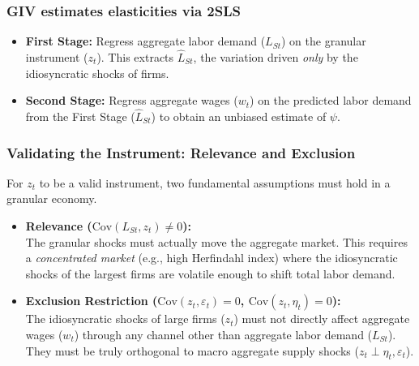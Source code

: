 \documentclass[aspectratio=169,11pt]{beamer}
\begin{document}
\begin{frame}
    \frametitle{GIV estimates elasticities via 2SLS}
    \begin{itemize}
        \item \large{\textbf{First Stage:} Regress aggregate labor demand ($L_{St}$) on the granular instrument ($z_t$). This extracts $\widehat{L}_{St}$, the variation driven \emph{only} by the idiosyncratic shocks of firms.}
              \vspace{0.5cm}
        \item \large{\textbf{Second Stage:} Regress aggregate wages ($w_t$) on the predicted labor demand from the First Stage ($\widehat{L}_{St}$) to obtain an unbiased estimate of $\psi$.}
    \end{itemize}

\end{frame}

\begin{frame}
    \frametitle{Validating the Instrument: Relevance and Exclusion}

    \vspace{0.3cm}
    {\Large
        For $z_t$ to be a valid instrument, two fundamental assumptions must hold in a granular economy.
    }

    \vspace{0.8cm}
    \begin{itemize}
        \item \textbf{Relevance ($\text{Cov}(L_{St}, z_t) \neq 0$):}\\
              \vspace{0.2cm}
              The granular shocks must actually move the aggregate market. This requires a \emph{concentrated market} (e.g., high Herfindahl index) where the idiosyncratic shocks of the largest firms are volatile enough to shift total labor demand.

              \vspace{0.6cm}
        \item \textbf{Exclusion Restriction ($\text{Cov}(z_t, \varepsilon_t) = 0$, $\text{Cov}(z_t, \eta_t) = 0$):}\\
              \vspace{0.2cm}
              The idiosyncratic shocks of large firms ($z_t$) must not directly affect aggregate wages ($w_t$) through any channel other than aggregate labor demand ($L_{St}$). They must be truly orthogonal to macro aggregate supply shocks ($z_t \perp \eta_t, \varepsilon_t$).
    \end{itemize}

\end{frame}
\end{document}

